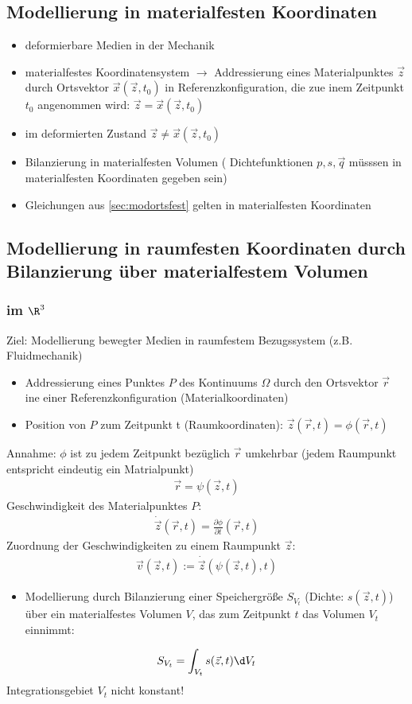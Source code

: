  \subsection{Modellierung in materialfesten Koordinaten}
 \begin{itemize}
 \item deformierbare Medien in der Mechanik
 \item materialfestes Koordinatensystem 
 \subitem $\rightarrow$ Addressierung eines Materialpunktes $\vec{z}$ durch Ortsvektor $\vec{x}(\vec{z},t_0)$ in Referenzkonfiguration, die zue inem Zeitpunkt $t_0$ angenommen wird: $\vec{z}=\vec{x}(\vec{z},t_0)$
 \item im deformierten Zustand $\vec{z}\neq\vec{x}(\vec{z},t_0)$
 \item Bilanzierung in materialfesten Volumen ( Dichtefunktionen $p,s,\vec{q}$ müsssen in materialfesten Koordinaten gegeben sein)
 \item Gleichungen aus \ref{sec:modortsfest} gelten in materialfesten Koordinaten
 \end{itemize}
 \subsection{Modellierung in raumfesten Koordinaten durch Bilanzierung über materialfestem Volumen}
 \subsubsection{im $\R^3$}
 Ziel: Modellierung bewegter Medien in raumfestem Bezugssystem (z.B. Fluidmechanik)
 \begin{itemize}
  \item Addressierung eines Punktes $P$ des Kontinuums $\Omega$ durch den Ortsvektor $\vec{r}$ ine einer Referenzkonfiguration (Materialkoordinaten)
  \item Position von $P$ zum Zeitpunkt t (Raumkoordinaten): $\vec{z}(\vec{r},t) = \phi(\vec{r},t)$ 
 \end{itemize}

Annahme: $\phi$ ist zu jedem Zeitpunkt bezüglich $\vec{r}$ umkehrbar (jedem Raumpunkt entspricht eindeutig ein Matrialpunkt)
\begin{align*}
\vec{r} = \psi(\vec{z},t)
\end{align*}
Geschwindigkeit des Materialpunktes $P$:
\begin{align*}
\dot{\vec{z}}(\vec{r},t) = \frac{\partial \phi}{\partial t}(\vec{r},t)
\end{align*}
Zuordnung der Geschwindigkeiten zu einem Raumpunkt $\vec{z}$:
\begin{align*}
\vec{v}(\vec{z},t) := \dot{\vec{z}}(\psi(\vec{z},t),t)
\end{align*}
\begin{itemize}
\item Modellierung durch Bilanzierung einer Speichergröße $S_{V_t}$ (Dichte: $s(\vec{z},t)$) über ein materialfestes Volumen $V$, das zum Zeitpunkt $t$ das Volumen $V_t$ einnimmt:
\end{itemize}
\begin{align*}
S_{V_t} = \int_{V_t} s(\vec{z},t) \d V_t
\end{align*}
Integrationsgebiet $V_t$ nicht konstant! 

